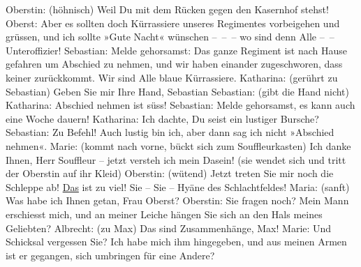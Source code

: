\begin{ledgroupsized}[t]{13cm}
           \pstart
           Oberstin: (höhnisch) Weil Du mit dem Rücken gegen den Kasernhof stehst!\pend
           \pstart
           Oberst: Aber es sollten doch Kürrassiere unseres Regimentes vorbeigehen und grüssen,
               und ich sollte »Gute Nacht« wünschen – – – wo sind denn Alle – – Unteroffizier!\pend
           \pstart
           Sebastian: Melde gehorsamst: Das ganze Regiment ist nach Hause gefahren um Abschied
               zu nehmen, und wir haben einander {\pb}zugeschworen, dass keiner zurückkommt. Wir sind Alle blaue Kürrassiere.\pend
           \pstart
           Katharina: (gerührt zu Sebastian) Geben Sie mir Ihre Hand, Sebastian\pend
           \pstart
           Sebastian: (gibt die Hand nicht)\pend
           \pstart
           Katharina: Abschied nehmen ist süss!\pend
           \pstart
           Sebastian: Melde gehorsamst, es kann auch eine Woche dauern!\pend
           \pstart
           Katharina: Ich dachte, Du seist ein lustiger Bursche?\pend
           \pstart
           Sebastian: Zu Befehl! Auch lustig bin ich, aber dann sag ich nicht »Abschied
               nehmen«.\pend
           \pstart
           Marie: (kommt nach vorne, bückt sich zum Souffleurkasten) Ich danke Ihnen, Herr
               Souffleur – jetzt versteh ich mein Dasein! (sie wendet sich und tritt der Oberstin
               auf ihr Kleid)\pend
           \pstart
           Oberstin: (wütend) Jetzt treten Sie mir noch die Schleppe ab! \uline{Das} ist zu viel! Sie – Sie – Hyäne des Schlachtfeldes!\pend
           \pstart
           Maria: (sanft) Was habe ich Ihnen getan, Frau Oberst?\pend
           \pstart
           Oberstin: Sie fragen noch? Mein Mann erschiesst mich, und an meiner Leiche hängen Sie
               sich an den Hals meines Geliebten?\pend
           \pstart
           Albrecht: (zu Max) Das sind  Zusammenhänge, Max!\pend
           \pstart
           Marie: Und  Schicksal vergessen Sie? Ich habe mich ihm
               hingegeben, und aus meinen Armen ist er gegangen, sich umbringen für eine Andere?
                  \label{K_L01900-1v}\label{K_L01900-1h}\pend

\end{ledgroupsized}
